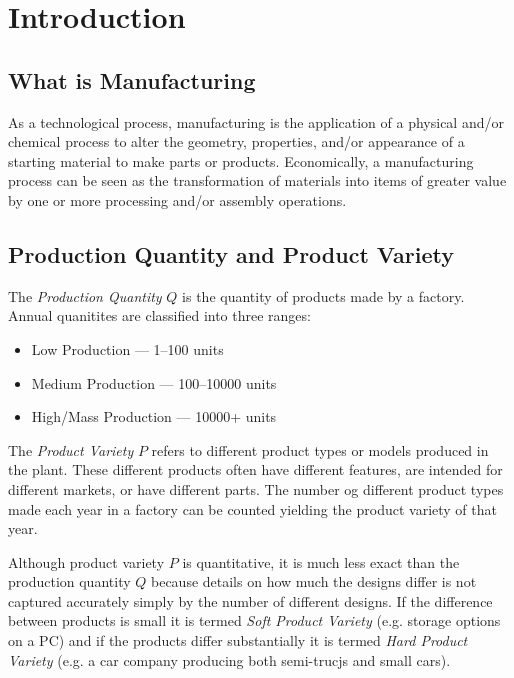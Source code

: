 

\section{Introduction}

\subsection{What is Manufacturing}
As a technological process, manufacturing is the application of a physical and/or chemical process to alter the geometry, properties, and/or appearance of a starting material to make parts or products.
Economically, a manufacturing process can be seen as the transformation of materials into items of greater value by one or more processing and/or assembly operations.

\subsection{Production Quantity and Product Variety}
The \textit{Production Quantity} $Q$ is the quantity of products made by a factory.
Annual quanitites are classified into three ranges:
\begin{itemize}
  \item Low Production --- 1--100 units
  \item Medium Production --- 100--\num{10000} units
  \item High/Mass Production --- \num{10000}+ units
\end{itemize}

The \textit{Product Variety} $P$ refers to different product types or models produced in the plant.
These different products often have different features, are intended for different markets, or have different parts.
The number og different product types made each year in a factory can be counted yielding the product variety of that year. 

Although product variety $P$ is quantitative, it is much less exact than the production quantity $Q$ because details on how much the designs differ is not captured accurately simply by the number of different designs.
If the difference between products is small it is termed \textit{Soft Product Variety} (e.g. storage options on a PC) and if the products differ substantially it is termed \textit{Hard Product Variety} (e.g. a car company producing both semi-trucjs and small cars).

